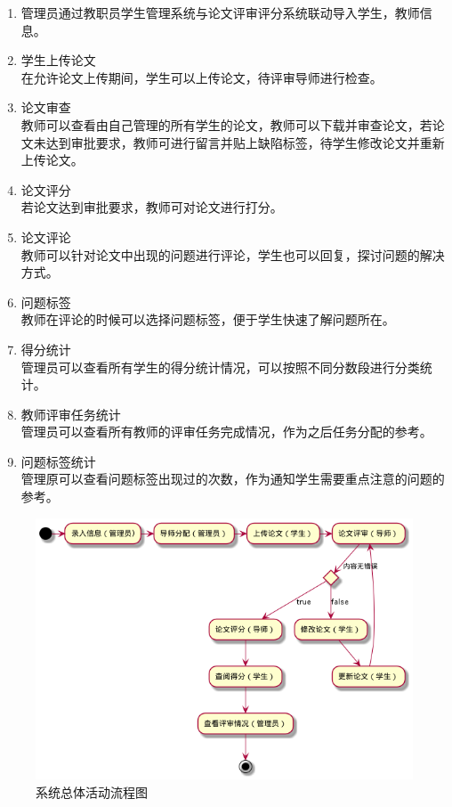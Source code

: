 \begin{enumerate}
    \item 管理员通过教职员学生管理系统与论文评审评分系统联动导入学生，教师信息。
    \item 学生上传论文\\
          在允许论文上传期间，学生可以上传论文，待评审导师进行检查。
    \item 论文审查\\
          教师可以查看由自己管理的所有学生的论文，教师可以下载并审查论文，若论文未达到审批要求，教师可进行留言并贴上缺陷标签，待学生修改论文并重新上传论文。
    \item 论文评分\\
          若论文达到审批要求，教师可对论文进行打分。
    \item 论文评论\\
          教师可以针对论文中出现的问题进行评论，学生也可以回复，探讨问题的解决方式。
    \item 问题标签\\
          教师在评论的时候可以选择问题标签，便于学生快速了解问题所在。
    \item 得分统计\\
          管理员可以查看所有学生的得分统计情况，可以按照不同分数段进行分类统计。
    \item 教师评审任务统计\\
          管理员可以查看所有教师的评审任务完成情况，作为之后任务分配的参考。
    \item 问题标签统计\\
          管理原可以查看问题标签出现过的次数，作为通知学生需要重点注意的问题的参考。

\end{enumerate}

\begin{figure}[H]
    \centering
    \includegraphics[scale = 0.6]{out/uml/流程图/系统总体活动流程图/系统总体活动流程图.png}
    \caption{\song\wuhao 系统总体活动流程图}
\end{figure}


